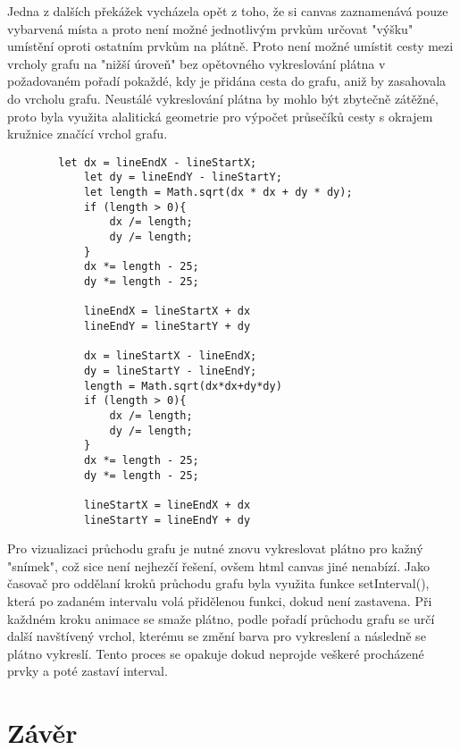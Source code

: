 \documentclass[12pt]{article}
\begin{document}
Jedna z dalších překážek vycházela opět z toho, že si canvas zaznamenává pouze
vybarvená místa a proto není možné jednotlivým prvkům určovat "výšku" \\ umístění
oproti ostatním prvkům na plátně. Proto není možné umístit cesty mezi vrcholy
grafu na "nižší úroveň" bez opětovného vykreslování plátna v požadovaném pořadí
pokaždé, kdy je přidána cesta do grafu, aniž by zasahovala do vrcholu grafu. 
Neustálé vykreslování plátna by mohlo být zbytečně zátěžné, proto byla využita alalitická
geometrie pro výpočet průsečíků cesty s okrajem kružnice
značící vrchol grafu.\par
\begin{lstlisting}
        let dx = lineEndX - lineStartX;
            let dy = lineEndY - lineStartY;
            let length = Math.sqrt(dx * dx + dy * dy);
            if (length > 0){
                dx /= length;
                dy /= length;
            }
            dx *= length - 25;
            dy *= length - 25;

            lineEndX = lineStartX + dx
            lineEndY = lineStartY + dy

            dx = lineStartX - lineEndX;
            dy = lineStartY - lineEndY;
            length = Math.sqrt(dx*dx+dy*dy)
            if (length > 0){
                dx /= length;
                dy /= length;
            }
            dx *= length - 25;
            dy *= length - 25;

            lineStartX = lineEndX + dx
            lineStartY = lineEndY + dy
\end{lstlisting}

Pro vizualizaci průchodu grafu je nutné znovu vykreslovat plátno pro kažný 
"snímek", což sice není nejhezčí řešení, ovšem html canvas jiné nenabízí.
Jako časovač pro oddělaní kroků průchodu grafu byla využita funkce setInterval(),
která po zadaném intervalu volá přidělenou funkci, dokud není zastavena. Při každném
kroku animace se smaže plátno, podle pořadí průchodu grafu se určí další navštívený 
vrchol, kterému se změní barva pro vykreslení a následně se plátno vykreslí. Tento
proces se opakuje dokud neprojde veškeré procházené prvky a poté zastaví interval.

\section{Závěr}
\end{document}
